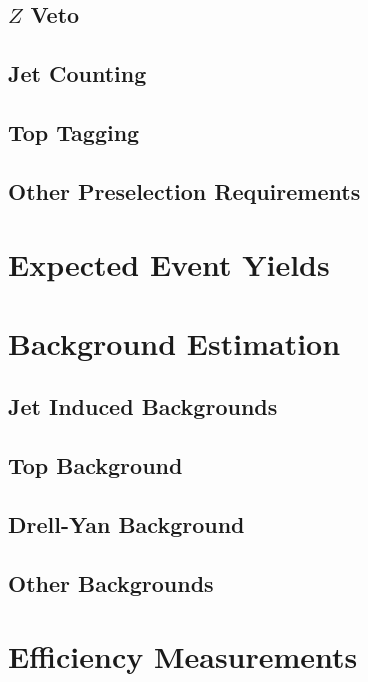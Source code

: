 \documentclass{cmspaper}
\begin{document}
  \subsection{$Z$ Veto}
    \label{sec:sel_zveto}
  \subsection{Jet Counting} 
    \label{sec:sel_jets}
  \subsection{Top Tagging}
    \label{sec:sel_toptag}
  \subsection{Other Preselection Requirements}
    \label{sec:sel_other}

\section{Expected Event Yields}
  \label{sec:yields}

\clearpage
\section{Background Estimation}
    \label{sec:backgrounds}
    \label{sec:bkg_intro}
  \subsection{Jet Induced Backgrounds}
    \label{sec:bkg_fakes}
  \subsection{Top Background}
    \label{sec:bkg_top}
  \subsection{Drell-Yan Background}
    \label{sec:bkg_dy}
    
  \subsection{Other Backgrounds}
    \label{sec:bkg_other}

\section{Efficiency Measurements}
    \label{sec:alleff}
\end{document}
